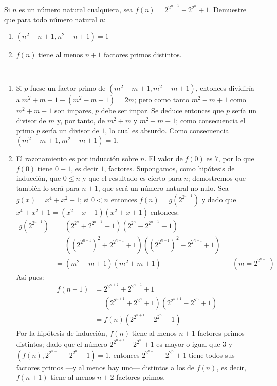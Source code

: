 \begin{exercise}
  \label{ex:pvpo2}
  Si $n$ es un número natural cualquiera, sea
  $f(n)=2^{2^{n+1}}+2^{2^{n}}+1$. Demuestre que para todo número
  natural $n$:
  \begin{enumerate}
  \item $(n^{2}-n+1, n^{2}+n+1)=1$
  \item $f(n)$ tiene al menos $n+1$ factores primos distintos.
  \end{enumerate}
\end{exercise}

\begin{solution}~
  \begin{enumerate}
  \item Si $p$ fuese un factor primo de $(m^{2}-m+1, m^{2}+m+1)$,
    entonces dividiría a $m^{2}+m+1-(m^{2}-m+1)=2m$; pero como tanto
    $m^{2}-m+1$ como $m^{2}+m+1$ son impares, $p$ debe ser impar. Se
    deduce entonces que $p$ sería un divisor de $m$ y, por tanto, de
    $m^{2}+m$ y $m^{2}+m+1$; como consecuencia el primo $p$ sería un
    divisor de $1$, lo cual es absurdo. Como consecuencia
    $(m^{2}-m+1, m^{2}+m+1)=1$.
  \item El razonamiento es por inducción sobre $n$. El valor de $f(0)$
    es $7$, por lo que $f(0)$ tiene $0+1$, es decir $1$,
    factores. Supongamos, como hipótesis de inducción, que $0\leq n$ y
    que el resultado es cierto para $n$; demostremos que también lo
    será para $n+1$, que será un número natural no nulo. Sea
    $g(x)=x^{4}+x^{2}+1$; si $0<n$ entonces $f(n)=g(2^{2^{n-1}})$ y
    dado que $x^{4}+x^{2}+1=(x^{2}-x+1)(x^{2}+x+1)$ entonces:
      \begin{align*}
        g(2^{2^{n-1}})&=(2^{2^{n}}+2^{2^{n-1}}+1)(2^{2^{n}}-2^{2^{n-1}}+1)&&\\
          &=((2^{2^{n-1}})^{2}+2^{2^{n-1}}+1)((2^{2^{n-1}})^{2}-2^{2^{n-1}}+1)&&\\
          &=(m^{2}-m+1)(m^{2}+m+1)&&(m=2^{2^{n-1}})
      \end{align*}
      Así pues:
      \begin{align*}
        f(n+1)&=2^{2^{n+2}}+2^{2^{n+1}}+1\\
          &=(2^{2^{n+1}}+2^{2^{n}}+1)(2^{2^{n+1}}-2^{2^{n}}+1)\\
          &=f(n)(2^{2^{n+1}}-2^{2^{n}}+1)
      \end{align*}
      Por la hipótesis de inducción, $f(n)$ tiene al menos $n+1$
      factores primos distintos; dado que el número
      $2^{2^{n+1}}-2^{2^{n}}+1$ es mayor o igual que $3$ y
      $(f(n),2^{2^{n+1}}-2^{2^{n}}+1)=1$, entonces
      $2^{2^{n+1}}-2^{2^{n}}+1$ tiene todos sus factores primos ---y
      al menos hay uno--- distintos a los de $f(n)$, es decir,
      $f(n+1)$ tiene al menos $n+2$ factores primos.
    \end{enumerate}
  \end{solution}

